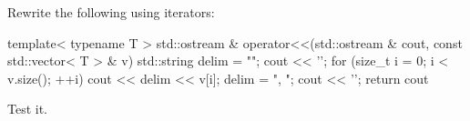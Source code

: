 Rewrite the following using iterators:
\begin{console}[fontsize=\footnotesize]
template< typename T >
std::ostream & operator<<(std::ostream & cout,
                          const std::vector< T > & v)
{
    std::string delim = "";                            
    cout << '{';
    for (size_t i = 0; i < v.size(); ++i)
    {
        cout << delim << v[i];
        delim = ", ";
    }
    cout << '}';
    return cout
}  
\end{console}
Test it.
